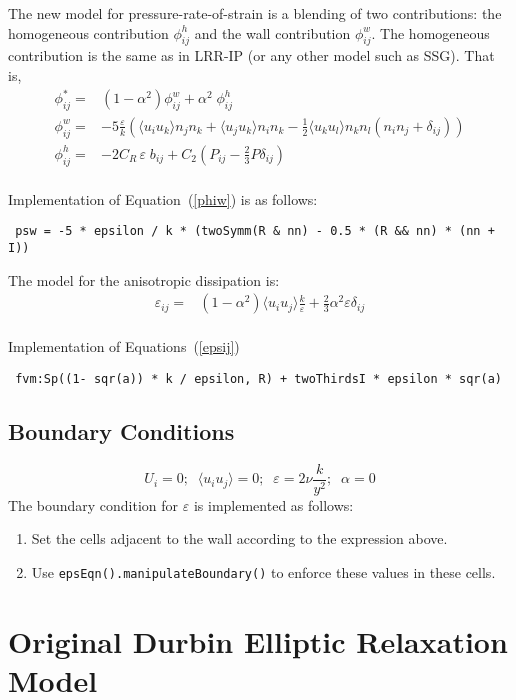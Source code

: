 \documentclass[11pt]{article}
\begin{document}
The new model for pressure-rate-of-strain is a blending of two contributions: the homogeneous contribution $\phi_{ij}^{h}$ and the wall contribution $\phi_{ij}^{w}$. The homogeneous contribution is the same as in LRR-IP (or any other model such as SSG).
That is,
\begin{align}
\phi_{ij}^{*} = & (1-\alpha^{2}) \phi_{ij}^{w} + \alpha^{2} \; \phi_{ij}^{h}  \\
\phi_{ij}^{w}  = & -5 \frac{\varepsilon}{k} \left(  \langle u_{i} u_{k} \rangle n_{j} n_{k}
+ \langle u_{j} u_{k} \rangle n_{i} n_{k}  - \frac{1}{2} \langle u_{k} u_{l} \rangle n_{k} n_{l}  (n_{i}n_{j} + \delta_{ij})\right)  \label{phiw} \\
\phi_{ij}^{h} = & - 2C_{R} \, \varepsilon \;  b_{ij} +  C_{2} (P_{ij} - \frac{2}{3}P\delta_{ij}) \\
\end{align}

Implementation of Equation~(\ref{phiw}) is as follows:
\begin{center}
\verb# psw = -5 * epsilon / k * (twoSymm(R & nn) - 0.5 * (R && nn) * (nn + I)) #
\end{center}

The model for the anisotropic dissipation is:
\begin{align}
\varepsilon_{ij} = & (1-\alpha^{2}) \langle u_{i} u_{j} \rangle \frac{k}{\varepsilon} + \frac{2}{3} \alpha^{2}  \varepsilon \delta_{ij}  \label{epsij}\\
\end{align}

Implementation of Equations~(\ref{epsij})
\begin{center}
\verb# fvm:Sp((1- sqr(a)) * k / epsilon, R) + twoThirdsI * epsilon * sqr(a)#
\end{center}

\subsection{Boundary Conditions}
\begin{equation}
U_{i} = 0;  \;\; \langle u_{i} u_{j} \rangle = 0; \;\;  \varepsilon = 2\nu \frac{k}{y^{2}};
\;\;  \alpha = 0
\end{equation}
The boundary condition for $\varepsilon$ is implemented as follows:
\begin{enumerate}
\item Set the cells adjacent to the wall according to the expression above.
\item Use \verb#epsEqn().manipulateBoundary()# to enforce these values in these cells.
\end{enumerate}

\section{Original Durbin Elliptic Relaxation Model}
\end{document}
